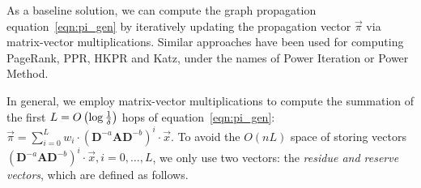 





As a baseline solution, we can compute the graph propagation equation~\eqref{eqn:pi_gen} by iteratively updating the propagation vector $\vec{\pi}$ via matrix-vector multiplications. Similar approaches have been used for computing PageRank, PPR, HKPR and Katz, under the names of Power Iteration or Power Method.  


In general, we employ matrix-vector multiplications to compute the summation of the first $L =O\left(\log {1\over \delta}\right)$ hops of equation~\eqref{eqn:pi_gen}: $\vec{\pi}=\sum_{i=0}^L w_i \cdot \left(\mathbf{D}^{-a}\mathbf{A}\mathbf{D}^{-b} \right)^i \cdot \vec{x}$.  To avoid the $O(nL)$ space of storing vectors $\left(\mathbf{D}^{-a}\mathbf{A} \mathbf{D}^{-b} \right)^i \cdot \vec{x}, i=0,\ldots, L$, we only use two vectors: the {\em residue and reserve vectors}, which are defined as follows. 


